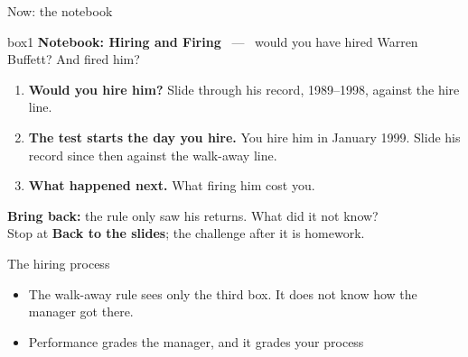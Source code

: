 \documentclass[aspectratio=169,10pt]{beamer}
\begin{document}
\begin{frame}{Now: the notebook}
\vskip 2pt
\begin{beamercolorbox}[rounded=true,sep=7pt,center]{box1}
\textbf{Notebook: Hiring and Firing} \ --- \ would you have hired Warren Buffett? And fired him?
\end{beamercolorbox}
\vskip 10pt
\begin{enumerate}
\item \textbf{Would you hire him?} Slide through his record, 1989--1998, against the hire line.
\vskip 5pt
\item \textbf{The test starts the day you hire.} You hire him in January 1999. Slide his record since then against the walk-away line.
\vskip 5pt
\item \textbf{What happened next.} What firing him cost you.
\end{enumerate}
\vskip 8pt
{\small \textbf{Bring back:} the rule only saw his returns. What did it not know? \\[2pt]
Stop at \textbf{Back to the slides}; the challenge after it is homework.}
\end{frame}
\begin{frame}{The hiring process}
\begin{center}
\end{center}
\vskip 10pt
\begin{itemize}
\item The walk-away rule sees only the third box. It does not know how the manager got there.
\vskip 8pt
\item Performance grades the manager, and it grades your process
\end{itemize}
\end{frame}
\end{document}
